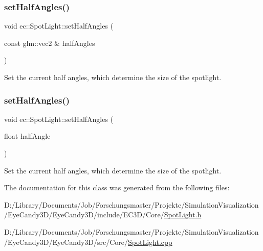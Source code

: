 \subsubsection{\texorpdfstring{set\+Half\+Angles()}{setHalfAngles()}\hspace{0.1cm}{\footnotesize\ttfamily [1/2]}}
{\footnotesize\ttfamily void ec\+::\+Spot\+Light\+::set\+Half\+Angles (\begin{DoxyParamCaption}\item[{const glm\+::vec2 \&}]{half\+Angles }\end{DoxyParamCaption})}



Set the current half angles, which determine the size of the spotlight. 

\mbox{\label{classec_1_1_spot_light_a0b9a13abe376b5e0513f243036b41af9}} 
\subsubsection{\texorpdfstring{set\+Half\+Angles()}{setHalfAngles()}\hspace{0.1cm}{\footnotesize\ttfamily [2/2]}}
{\footnotesize\ttfamily void ec\+::\+Spot\+Light\+::set\+Half\+Angles (\begin{DoxyParamCaption}\item[{float}]{half\+Angle }\end{DoxyParamCaption})}



Set the current half angles, which determine the size of the spotlight. 



The documentation for this class was generated from the following files\+:\begin{DoxyCompactItemize}
\item 
D\+:/\+Library/\+Documents/\+Job/\+Forschungsmaster/\+Projekte/\+Simulation\+Visualization/\+Eye\+Candy3\+D/\+Eye\+Candy3\+D/include/\+E\+C3\+D/\+Core/\mbox{\hyperlink{_spot_light_8h}{Spot\+Light.\+h}}\item 
D\+:/\+Library/\+Documents/\+Job/\+Forschungsmaster/\+Projekte/\+Simulation\+Visualization/\+Eye\+Candy3\+D/\+Eye\+Candy3\+D/src/\+Core/\mbox{\hyperlink{_spot_light_8cpp}{Spot\+Light.\+cpp}}\end{DoxyCompactItemize}
